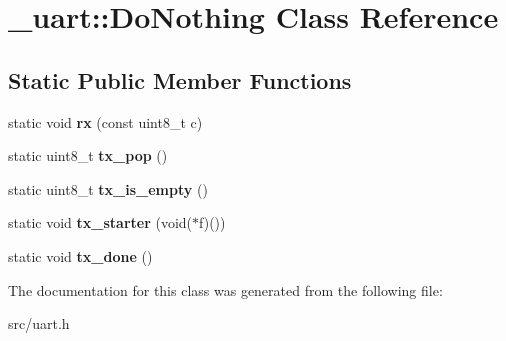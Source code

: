 \hypertarget{class__uart_1_1DoNothing}{}\section{\+\_\+uart\+:\+:Do\+Nothing Class Reference}
\label{class__uart_1_1DoNothing}
\subsection*{Static Public Member Functions}
\begin{DoxyCompactItemize}
\item 
static void {\bfseries rx} (const uint8\+\_\+t c)\hypertarget{class__uart_1_1DoNothing_a5da1958995ac106d5009f962dce7ebd7}{}\label{class__uart_1_1DoNothing_a5da1958995ac106d5009f962dce7ebd7}

\item 
static uint8\+\_\+t {\bfseries tx\+\_\+pop} ()\hypertarget{class__uart_1_1DoNothing_a35623aa16751e5dbe382d95c0b3226d5}{}\label{class__uart_1_1DoNothing_a35623aa16751e5dbe382d95c0b3226d5}

\item 
static uint8\+\_\+t {\bfseries tx\+\_\+is\+\_\+empty} ()\hypertarget{class__uart_1_1DoNothing_af4958b5945ef09cc249afade14d41c0b}{}\label{class__uart_1_1DoNothing_af4958b5945ef09cc249afade14d41c0b}

\item 
static void {\bfseries tx\+\_\+starter} (void($\ast$f)())\hypertarget{class__uart_1_1DoNothing_ac3db5f40bb9cfa56523ff831c4bc4971}{}\label{class__uart_1_1DoNothing_ac3db5f40bb9cfa56523ff831c4bc4971}

\item 
static void {\bfseries tx\+\_\+done} ()\hypertarget{class__uart_1_1DoNothing_a747b237efe72975ed73f1d2d929cef17}{}\label{class__uart_1_1DoNothing_a747b237efe72975ed73f1d2d929cef17}

\end{DoxyCompactItemize}


The documentation for this class was generated from the following file\+:\begin{DoxyCompactItemize}
\item 
src/uart.\+h\end{DoxyCompactItemize}
